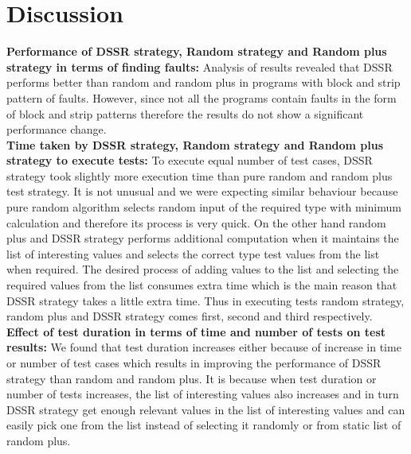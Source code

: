 \documentclass[conference]{IEEEtran}
\begin{document}


\section{Discussion}\label{sec:discussion}
\textbf{Performance of DSSR strategy, Random strategy and Random plus strategy in terms of finding faults:} 
Analysis of results revealed that DSSR performs better than random and random plus in programs with block and strip pattern of faults. However, since not all the programs contain faults in the form of block and strip patterns therefore the results do not show a significant performance change. \\
\indent \textbf{Time taken by DSSR strategy, Random strategy and Random plus strategy to execute tests:}
To execute equal number of test cases, DSSR strategy took slightly more execution time than pure random and random plus test strategy. It is not unusual and we were expecting similar behaviour because pure random algorithm selects random input of the required type with minimum calculation and therefore its process is very quick. On the other hand random plus and DSSR strategy performs additional computation when it maintains the list of interesting values and selects the correct type test values from the list when required. The desired process of adding values to the list and selecting the required values from the list consumes extra time which is the main reason that DSSR strategy takes a little extra time. Thus in executing tests random strategy, random plus and DSSR strategy comes first, second and third respectively. \\
\indent \textbf{Effect of test duration in terms of time and number of tests on test results:} 
We found that test duration increases either because of  increase in time or number of test cases which results in improving the performance of DSSR strategy than random and random plus. It is because when test duration or number of tests increases, the list of interesting values also increases and in turn DSSR strategy get enough relevant values in the list of interesting values and can easily pick one from the list instead of selecting it randomly or from static list of random plus.\\
\end{document}
